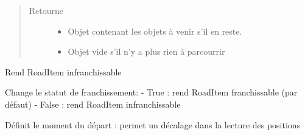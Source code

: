 \documentclass[a4paper,10pt,french]{sphinxmanual}
\begin{document}
\begin{fulllineitems}
\begin{fulllineitems}
\begin{quote}
\begin{description}
\item[{Retourne}] \leavevmode
\begin{itemize}
\item {} 
Objet  contenant les objets  à venir s’il en reste.

\item {} 
Objet  vide s’il n’y a plus rien à parcourrir

\end{itemize}


\end{description}\end{quote}

\end{fulllineitems}


\begin{fulllineitems}
\label{\detokenize{road_objects/road_item:road_objects.road_item.RoadItem.set_impassable}}
Rend RoadItem infranchissable

\end{fulllineitems}


\begin{fulllineitems}
\label{\detokenize{road_objects/road_item:road_objects.road_item.RoadItem.set_passable}}
Change le statut de franchissement:
- True : rend RoadItem franchissable (par défaut)
- False : rend RoadItem infranchissable

\end{fulllineitems}


\begin{fulllineitems}
\label{\detokenize{road_objects/road_item:road_objects.road_item.RoadItem.start}}
Définit le moment du départ : permet un décalage dans la lecture des positions

\end{fulllineitems}


\end{fulllineitems}
\end{document}
